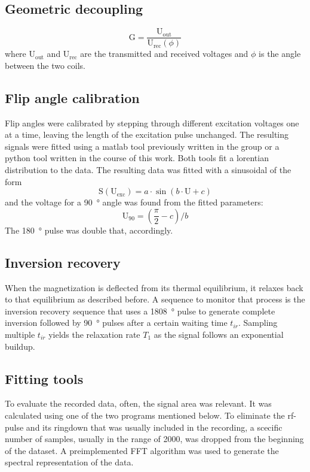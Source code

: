         \subsection{Geometric decoupling}
            \begin{equation}
            \mathrm{G}=\frac{\mathrm{U_{out}}}{\mathrm{U_{rec}}(\phi)}
            \end{equation}
            where $\mathrm{U_{out}}$ and $\mathrm{U_{rec}}$ are the transmitted and received voltages and $\phi$ is the angle between the two coils.
        \subsection{Flip angle calibration}
            Flip angles were calibrated by stepping through different excitation voltages one at a time, leaving the length of the excitation pulse unchanged. The resulting signals were fitted using a matlab tool previously written in the group or a python tool written in the course of this work. Both tools fit a lorentian distribution to the data.
            The resulting data was fitted with a sinusoidal of the form
            \begin{equation}
                \mathrm{S}(\mathrm{U_{exc}})= a \cdot \sin(b\cdot \mathrm{U} + c)
            \end{equation}
            and the voltage for a  \SI{90}{\degree} angle was found from the fitted parameters:
            \begin{equation}
                \mathrm{U}_{90} = (\frac{\pi}{2}-c)/b
            \end{equation}
            The \SI{180}{\degree} pulse was double that, accordingly.
        \subsection{Inversion recovery}
            When the magnetization is deflected from its thermal equilibrium, it relaxes back to that equilibrium as described before. A sequence to monitor that process is the inversion recovery sequence that uses a \SI{1808}{\degree} pulse to generate complete inversion followed by \SI{90}{\degree} pulses after a certain waiting time $t_{ir}$. Sampling multiple $t_{ir}$ yields the relaxation rate $T_1$ as the signal follows an exponential buildup.
        \subsection{Fitting tools}
            To evaluate the recorded data, often, the signal area was relevant. It was calculated using one of the two programs mentioned below. To eliminate the rf-pulse and its ringdown that was usually included in the recording, a scecific number of samples, usually in the range of 2000, was dropped from the beginning of the dataset. A preimplemented FFT algorithm was used to generate the spectral representation of the data.

